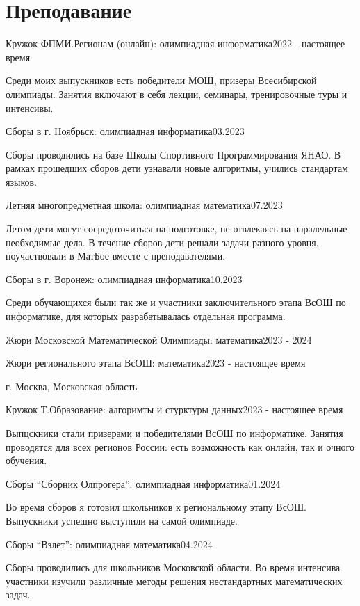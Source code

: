 \section{\textbf{Преподавание}}
\resumeSubHeadingListStart

\resumePOR
{Кружок ФПМИ.Регионам (онлайн): }{олимпиадная информатика}{2022 - настоящее время}

Среди моих выпускников есть
победители МОШ, призеры Всесибирской олимпиады. Занятия включают в себя лекции, семинары, тренировочные туры и интенсивы.

\resumePOR
{Сборы в г. Ноябрьск: }{олимпиадная информатика}{03.2023}

Сборы проводились на базе Школы Спортивного Программирования ЯНАО. В рамках прошедших сборов дети узнавали новые
алгоритмы, учились стандартам языков.

\resumePOR
{Летняя многопредметная школа: }{олимпиадная математика}{07.2023}

Летом дети могут сосредоточиться на подготовке, не отвлекаясь на паралельные необходимые дела. В течение сборов дети решали 
задачи разного уровня, поучаствовали в МатБое вместе с преподавателями.

\resumePOR
{Сборы в г. Воронеж: }{олимпиадная информатика}{10.2023}

Среди обучающихся были так же и участники заключительного этапа ВсОШ по информатике, для которых разрабатывалась отдельная программа.

\resumePOR
{Жюри Московской Математической Олимпиады: }{математика}{2023 - 2024}

\resumePOR
{Жюри регионального этапа ВсОШ: }{математика}{2023 - настоящее время}

г. Москва, Московская область

\resumePOR
{Кружок Т.Образование: }{алгоримты и стурктуры данных}{2023 - настоящее время}

Выпцскники стали призерами и победителями ВсОШ по информатике. Занятия проводятся для всех регионов России: есть возможность как
онлайн, так и очного обучения.

\resumePOR
{Сборы ``Сборник Олпрогера'': }{олимпиадная информатика}{01.2024}

Во время сборов я готовил школьников к региональному этапу ВсОШ. Выпускники успешно выступили на самой олимпиаде.

\resumePOR
{Сборы ``Взлет'': }{олимпиадная математика}{04.2024}

Сборы проводились для школьников Московской области. Во время интенсива участники изучили различные методы решения нестандартных
математических задач.

